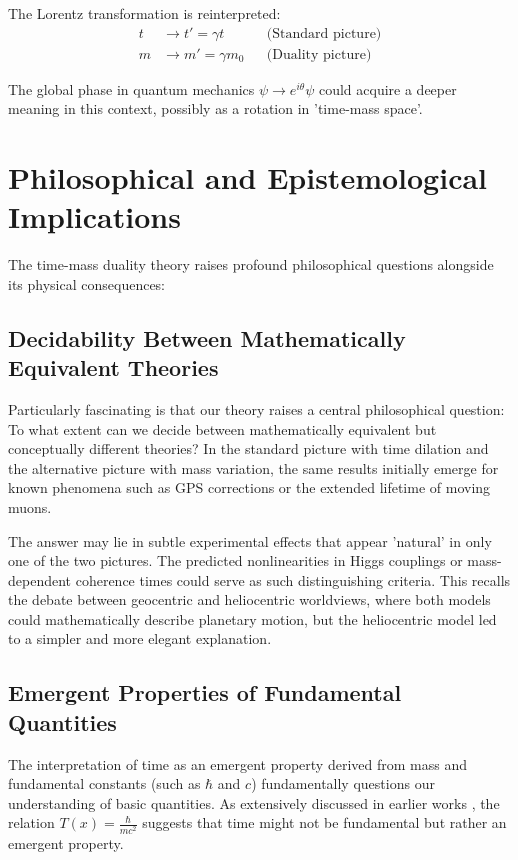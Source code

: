 \documentclass[a4paper,12pt]{article}
\newcommand{\Tfield}{T(x)} %
\begin{document}
	The Lorentz transformation is reinterpreted:
	\begin{align}
		t &\to t' = \gamma t & &\text{(Standard picture)} \\
		m &\to m' = \gamma m_0 & &\text{(Duality picture)}
	\end{align}
	
	The global phase in quantum mechanics $\psi \to e^{i\theta}\psi$ could acquire a deeper meaning in this context, possibly as a rotation in 'time-mass space'.
	
	\section{Philosophical and Epistemological Implications}
	
	The time-mass duality theory raises profound philosophical questions alongside its physical consequences:
	
	\subsection{Decidability Between Mathematically Equivalent Theories}
	
	Particularly fascinating is that our theory raises a central philosophical question: To what extent can we decide between mathematically equivalent but conceptually different theories? In the standard picture with time dilation and the alternative picture with mass variation, the same results initially emerge for known phenomena such as GPS corrections or the extended lifetime of moving muons.
	
	The answer may lie in subtle experimental effects that appear 'natural' in only one of the two pictures. The predicted nonlinearities in Higgs couplings or mass-dependent coherence times could serve as such distinguishing criteria. This recalls the debate between geocentric and heliocentric worldviews, where both models could mathematically describe planetary motion, but the heliocentric model led to a simpler and more elegant explanation.
	
	\subsection{Emergent Properties of Fundamental Quantities}
	
	The interpretation of time as an emergent property derived from mass and fundamental constants (such as $\hbar$ and $c$) fundamentally questions our understanding of basic quantities. As extensively discussed in earlier works \cite{pascher_zeit_2025, pascher_natur_2025}, the relation $\Tfield = \frac{\hbar}{mc^2}$ suggests that time might not be fundamental but rather an emergent property.
	
\end{document}
